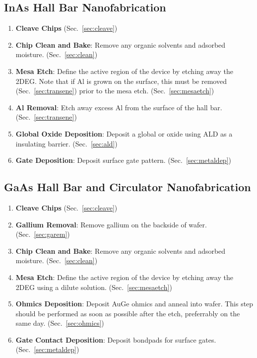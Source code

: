 \subsection{InAs Hall Bar Nanofabrication}
\begin{enumerate}
    \item \textbf{Cleave Chips} (Sec.~\ref{sec:cleave})
    \item \textbf{Chip Clean and Bake}: Remove any organic solvents and adsorbed moisture. (Sec.~\ref{sec:clean})
    \item \textbf{Mesa Etch}: Define the active region of the device by etching away the 2DEG. Note that if Al is grown on the surface, this must be removed (Sec.~\ref{sec:transene}) prior to the mesa etch. (Sec.~\ref{sec:mesaetch})
    \item \textbf{Al Removal}: Etch away excess Al from the surface of the hall bar. (Sec.~\ref{sec:transene})
    \item \textbf{Global Oxide Deposition}: Deposit a global  or  oxide using ALD as a insulating barrier. (Sec.~\ref{sec:ald})
    \item \textbf{Gate Deposition}: Deposit surface gate pattern. (Sec.~\ref{sec:metaldep})
\end{enumerate}

\subsection{GaAs Hall Bar and Circulator Nanofabrication}
\begin{enumerate}
    \item \textbf{Cleave Chips} (Sec.~\ref{sec:cleave})
    \item \textbf{Gallium Removal}: Remove gallium on the backside of wafer. (Sec.~\ref{sec:garem})
    \item \textbf{Chip Clean and Bake}: Remove any organic solvents and adsorbed moisture. (Sec.~\ref{sec:clean})
    \item \textbf{Mesa Etch}: Define the active region of the device by etching away the 2DEG using a dilute  solution. (Sec.~\ref{sec:mesaetch})
    \item \textbf{Ohmics Deposition}: Deposit AuGe ohmics and anneal into wafer. This step should be performed as soon as possible after the etch, preferrably on the same day. (Sec.~\ref{sec:ohmics})
    \item \textbf{Gate Contact Deposition}: Deposit bondpads for surface gates. (Sec.~\ref{sec:metaldep})
\end{enumerate}

